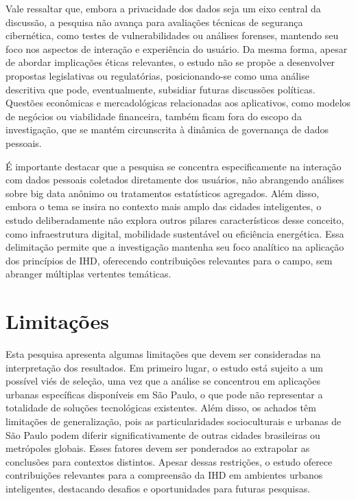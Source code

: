 \documentclass[
	12pt,				%
	oneside,			%
	a4paper,			%
	english,			%
	brazil				%
	]{abntex2ppgsi}
\begin{document}
    Vale ressaltar que, embora a privacidade dos dados seja um eixo central da discussão, a pesquisa não avança para avaliações técnicas de segurança cibernética, como testes de vulnerabilidades ou análises forenses, mantendo seu foco nos aspectos de interação e experiência do usuário. Da mesma forma, apesar de abordar implicações éticas relevantes, o estudo não se propõe a desenvolver propostas legislativas ou regulatórias, posicionando-se como uma análise descritiva que pode, eventualmente, subsidiar futuras discussões políticas. Questões econômicas e mercadológicas relacionadas aos aplicativos, como modelos de negócios ou viabilidade financeira, também ficam fora do escopo da investigação, que se mantém circunscrita à dinâmica de governança de dados pessoais.

    É importante destacar que a pesquisa se concentra especificamente na interação com dados pessoais coletados diretamente dos usuários, não abrangendo análises sobre big data anônimo ou tratamentos estatísticos agregados. Além disso, embora o tema se insira no contexto mais amplo das cidades inteligentes, o estudo deliberadamente não explora outros pilares característicos desse conceito, como infraestrutura digital, mobilidade sustentável ou eficiência energética. Essa delimitação permite que a investigação mantenha seu foco analítico na aplicação dos princípios de IHD, oferecendo contribuições relevantes para o campo, sem abranger múltiplas vertentes temáticas.



  \section{Limitações}

    Esta pesquisa apresenta algumas limitações que devem ser consideradas na interpretação dos resultados. Em primeiro lugar, o estudo está sujeito a um possível viés de seleção, uma vez que a análise se concentrou em aplicações urbanas específicas disponíveis em São Paulo, o que pode não representar a totalidade de soluções tecnológicas existentes. Além disso, os achados têm limitações de generalização, pois as particularidades socioculturais e urbanas de São Paulo podem diferir significativamente de outras cidades brasileiras ou metrópoles globais. Esses fatores devem ser ponderados ao extrapolar as conclusões para contextos distintos. Apesar dessas restrições, o estudo oferece contribuições relevantes para a compreensão da IHD em ambientes urbanos inteligentes, destacando desafios e oportunidades para futuras pesquisas.
\end{document}
